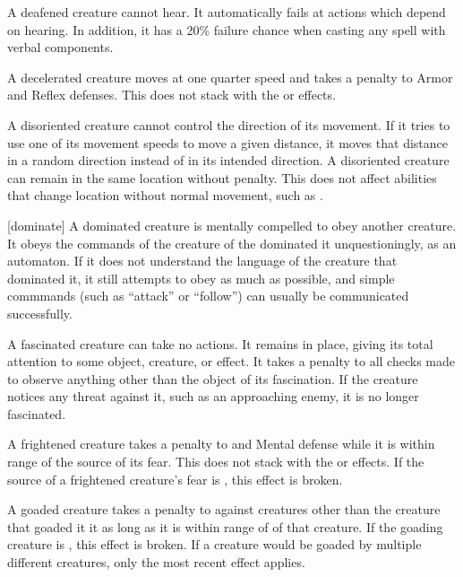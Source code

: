  A deafened creature cannot hear. It automatically fails at actions which depend on hearing. In addition, it has a 20\% failure chance when casting any spell with verbal components.

 A decelerated creature moves at one quarter speed and takes a  penalty to Armor and Reflex defenses.
This does not stack with the \slowed or \immobilized effects.

 A disoriented creature cannot control the direction of its movement.
If it tries to use one of its movement speeds to move a given distance, it moves that distance in a random direction instead of in its intended direction.
A disoriented creature can remain in the same location without penalty.
This does not affect abilities that change location without normal movement, such as .

[dominate] A dominated creature is mentally compelled to obey another creature.
It obeys the commands of the creature of the dominated it unquestioningly, as an automaton.
If it does not understand the language of the creature that dominated it, it still attempts to obey as much as possible, and simple commmands (such as ``attack'' or ``follow'') can usually be communicated successfully.

 A fascinated creature can take no actions. It remains in place, giving its total attention to some object, creature, or effect. It takes a  penalty to all checks made to observe anything other than the object of its fascination.
If the creature notices any threat against it, such as an approaching enemy, it is no longer fascinated.

 A frightened creature takes a  penalty to  and Mental defense while it is within \rngmed range of the source of its fear.
This does not stack with the \shaken or \panicked effects.
If the source of a frightened creature's fear is , this effect is broken.

 A goaded creature takes a  penalty to  against creatures other than the creature that goaded it it as long as it is within \rngmed range of of that creature.
If the goading creature is , this effect is broken.
If a creature would be goaded by multiple different creatures, only the most recent effect applies.

